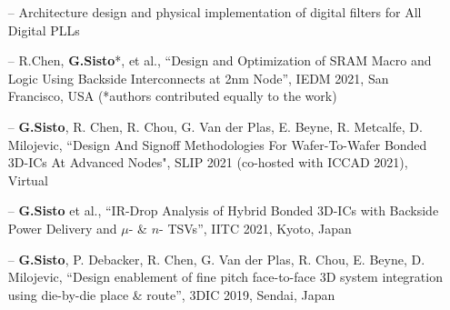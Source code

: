 \documentclass[10pt,a4paper,fancychapters]{altacv}
\begin{document}


\begin{itemize}
    \setlength{\itemindent}{0.5em}
    \item[--]  \small {Architecture design and physical implementation of digital filters for All Digital PLLs}
    
\end{itemize}



\begin{fullwidth}
\begin{itemize}
    \setlength{\itemindent}{0.5em}
    \item[--] \small{R.Chen, \textbf{G.Sisto}*,  et al., ``Design and Optimization of SRAM Macro and Logic Using Backside
    Interconnects at 2nm Node'', IEDM 2021, San Francisco, USA (*authors contributed equally to the work)} 
    \item[--] \small{\textbf{G.Sisto}, R. Chen, R. Chou, G. Van der Plas, E. Beyne, R. Metcalfe, D. Milojevic, ``Design
    And Signoff Methodologies For Wafer-To-Wafer Bonded 3D-ICs At Advanced Nodes", SLIP 2021 (co-hosted with ICCAD
    2021), Virtual} 
    \item[--] \small{\textbf{G.Sisto} et al., ``IR-Drop Analysis of Hybrid Bonded 3D-ICs with Backside Power Delivery and $\mu$- \& $n$- TSVs'', IITC 2021, Kyoto, Japan} 
    \item[--] \small{\textbf{G.Sisto}, P. Debacker, R. Chen, G. Van der Plas, R. Chou, E. Beyne, D. Milojevic, ``Design enablement of fine pitch face-to-face 3D system integration using die-by-die place \& route'', 3DIC 2019, Sendai, Japan}
\end{itemize}
\end{fullwidth}
\end{document}
